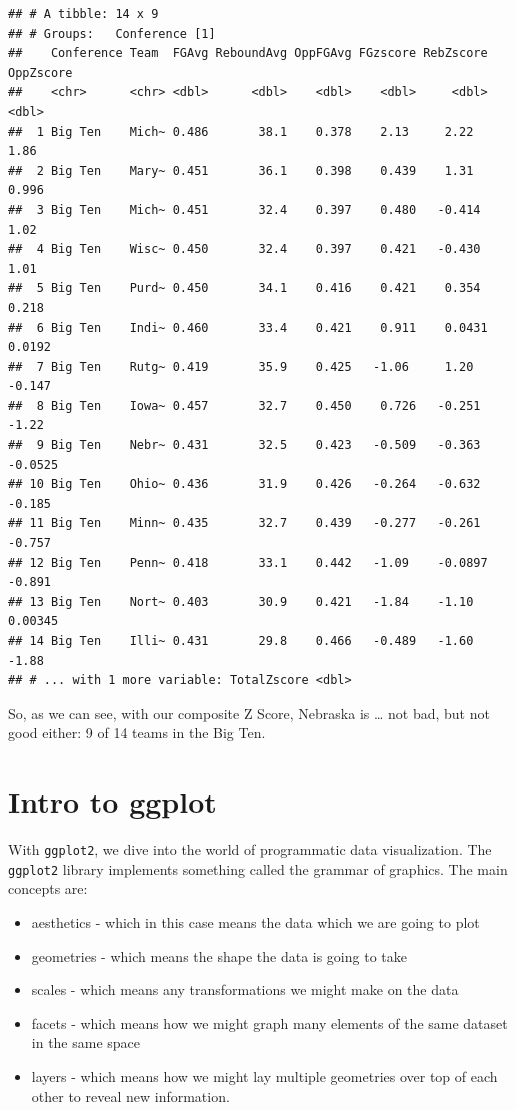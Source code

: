 \documentclass[]{book}
\providecommand{\tightlist}{%
  \setlength{\itemsep}{0pt}\setlength{\parskip}{0pt}}
\begin{document}
\begin{verbatim}
## # A tibble: 14 x 9
## # Groups:   Conference [1]
##    Conference Team  FGAvg ReboundAvg OppFGAvg FGzscore RebZscore OppZscore
##    <chr>      <chr> <dbl>      <dbl>    <dbl>    <dbl>     <dbl>     <dbl>
##  1 Big Ten    Mich~ 0.486       38.1    0.378    2.13     2.22     1.86   
##  2 Big Ten    Mary~ 0.451       36.1    0.398    0.439    1.31     0.996  
##  3 Big Ten    Mich~ 0.451       32.4    0.397    0.480   -0.414    1.02   
##  4 Big Ten    Wisc~ 0.450       32.4    0.397    0.421   -0.430    1.01   
##  5 Big Ten    Purd~ 0.450       34.1    0.416    0.421    0.354    0.218  
##  6 Big Ten    Indi~ 0.460       33.4    0.421    0.911    0.0431   0.0192 
##  7 Big Ten    Rutg~ 0.419       35.9    0.425   -1.06     1.20    -0.147  
##  8 Big Ten    Iowa~ 0.457       32.7    0.450    0.726   -0.251   -1.22   
##  9 Big Ten    Nebr~ 0.431       32.5    0.423   -0.509   -0.363   -0.0525 
## 10 Big Ten    Ohio~ 0.436       31.9    0.426   -0.264   -0.632   -0.185  
## 11 Big Ten    Minn~ 0.435       32.7    0.439   -0.277   -0.261   -0.757  
## 12 Big Ten    Penn~ 0.418       33.1    0.442   -1.09    -0.0897  -0.891  
## 13 Big Ten    Nort~ 0.403       30.9    0.421   -1.84    -1.10     0.00345
## 14 Big Ten    Illi~ 0.431       29.8    0.466   -0.489   -1.60    -1.88   
## # ... with 1 more variable: TotalZscore <dbl>
\end{verbatim}

So, as we can see, with our composite Z Score, Nebraska is \ldots{} not
bad, but not good either: 9 of 14 teams in the Big Ten.

\chapter{Intro to ggplot}\label{intro-to-ggplot}

With \texttt{ggplot2}, we dive into the world of programmatic data
visualization. The \texttt{ggplot2} library implements something called
the grammar of graphics. The main concepts are:

\begin{itemize}
\tightlist
\item
  aesthetics - which in this case means the data which we are going to
  plot
\item
  geometries - which means the shape the data is going to take
\item
  scales - which means any transformations we might make on the data
\item
  facets - which means how we might graph many elements of the same
  dataset in the same space
\item
  layers - which means how we might lay multiple geometries over top of
  each other to reveal new information.
\end{itemize}
\end{document}
